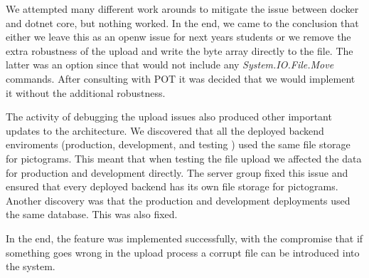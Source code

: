 We attempted many different work arounds to mitigate the issue between docker and dotnet core, but nothing worked. In the end, we came to the conclusion that either we leave this as an openw issue for next years students or we remove the extra robustness of the upload and write the byte array directly to the file. The latter was an option since that would not include any \textit{System.IO.File.Move} commands. After consulting with \gls{POT} it was decided that we would implement it without the additional robustness.

The activity of debugging the upload issues also produced other important updates to the architecture. We discovered that all the  deployed backend enviroments (production, development, and testing ) used the same file storage for pictograms. This meant that when testing the file upload we affected the data for production and development directly. The server group fixed this issue and ensured that every deployed backend has its own file storage for pictograms. Another discovery was that the production and development deployments used the same database. This was also fixed.

In the end, the feature was implemented successfully, with the compromise that if something goes wrong in the upload process a corrupt file can be introduced into the system.
